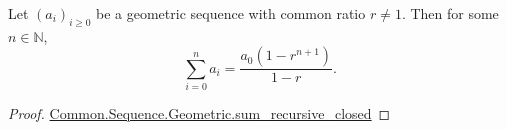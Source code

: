 \documentclass{article}
\begin{document}
\begin{theorem}

  Let $(a_i)_{i \geq 0}$ be a geometric sequence with common ratio $r \neq 1$.
  Then for some $n \in \mathbb{N}$,
  $$\sum_{i=0}^n a_i = \frac{a_0(1 - r^{n+1})}{1 - r}.$$

\end{theorem}

\begin{proof}

  \href{Geometric.lean}{Common.Sequence.Geometric.sum_recursive_closed}

\end{proof}
\end{document}
